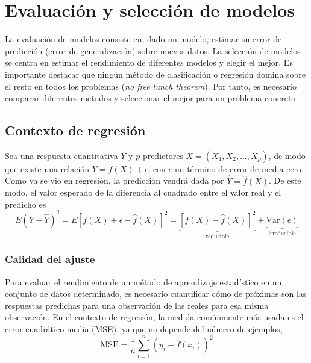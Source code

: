 \chapter{Evaluación y selección de modelos}\label{Chapter4} 

La evaluación de modelos consiste en, dado un modelo, estimar su error de predicción (error de generalización) sobre nuevos datos. La selección de modelos se centra en estimar el rendimiento de diferentes modelos y elegir el mejor. Es importante destacar que ningún método de clasificación o regresión domina sobre el resto en todos los problemas (\textit{no free lunch theorem}). Por tanto, es necesario comparar diferentes métodos y seleccionar el mejor para un problema concreto. 

\section{Contexto de regresión}

Sea una respuesta cuantitativa $Y$ y $p$ predictores $X = (X_1, X_2, \dots, X_p)$, de modo que existe una relación $Y = f(X) + \epsilon$, con $\epsilon$ un término de error de media cero. Como ya se vio en regresión, la predicción vendrá dada por $\hat{Y} = \hat{f}(X)$. De este modo, el valor esperado de la diferencia al cuadrado entre el valor real y el predicho es
\begin{equation}
E(Y - \hat{Y})^2 = E[f(X) + \epsilon - \hat{f}(X)]^2 = \underbrace{[f(X) - \hat{f}(X)]^2}_{\text{reducible}} + \underbrace{\text{Var}(\epsilon)}_{\text{irreducible}}
\end{equation}

\subsection{Calidad del ajuste}

Para evaluar el rendimiento de un método de aprendizaje estadístico en un conjunto de datos determinado, es necesario cuantificar cómo de próximas son las respuestas predichas para una observación de las reales para esa misma observación. En el contexto de regresión, la medida comúnmente más usada es el error cuadrático media (MSE), ya que no depende del número de ejemplos, 
\begin{equation}
\text{MSE} = \frac{1}{n} \sum_{i=1}^n (y_i - \hat{f}(x_i))^2
\end{equation}

